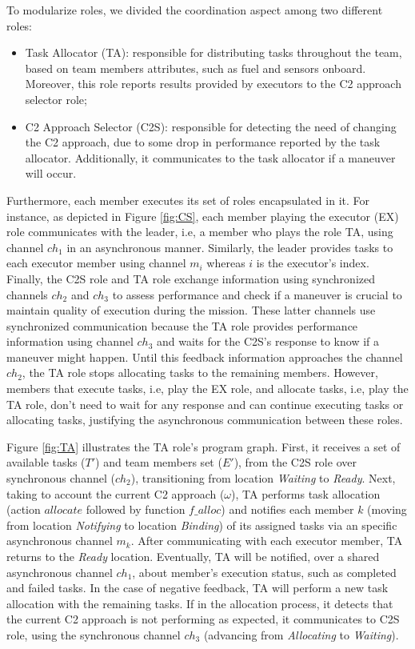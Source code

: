 To modularize roles, we divided the coordination aspect among two different roles:

\begin{itemize}
    \item Task Allocator (TA): responsible for distributing tasks throughout the team, based on team members attributes, such as fuel and sensors onboard. Moreover, this role reports results provided by executors to the C2 approach selector role;
    \item C2 Approach Selector (C2S): responsible for detecting the need of changing the C2 approach, due to some drop in performance reported by the task allocator. Additionally, it communicates to the task allocator if a maneuver will occur.  
\end{itemize}

Furthermore, each member executes its set of roles encapsulated in it. For instance, as depicted in Figure \ref{fig:CS}, each member playing the executor (EX) role communicates with the leader, i.e, a member who plays the role TA, using channel \textit{$ch_1$} in an asynchronous manner. Similarly, the leader provides tasks to each executor member using channel \textit{$m_i$} whereas $i$ is the executor's index. Finally, the C2S role and TA role exchange information using synchronized channels \textit{$ch_2$} and \textit{$ch_3$} to assess performance and check if a maneuver is crucial to maintain quality of execution during the mission. These latter channels use synchronized communication because the TA role provides performance information using channel \textit{$ch_3$} and waits for the C2S's response to know if a maneuver might happen. Until this feedback information approaches the channel \textit{$ch_2$}, the TA role stops allocating tasks to the remaining members. However, members that execute tasks, i.e, play the EX role, and allocate tasks, i.e, play the TA role, don't need to wait for any response and can continue executing tasks or allocating tasks, justifying the asynchronous communication between these roles.

Figure \ref{fig:TA} illustrates the TA role's program graph. First, it receives a set of available tasks ($T'$) and team members set ($E'$), from the C2S role over synchronous channel ($ch_2$), transitioning from location \textit{Waiting} to \textit{Ready}. Next, taking to account the current C2 approach ($\omega$), TA performs task allocation (action $allocate$ followed by function $f\_alloc$) and notifies each member $k$ (moving from location \textit{Notifying} to location \textit{Binding}) of its assigned tasks via an specific asynchronous channel $m_k$. After communicating with each executor member, TA returns to the \textit{Ready} location. Eventually, TA will be notified, over a shared asynchronous channel $ch_1$, about member's execution status, such as completed and failed tasks. In the case of negative feedback, TA will perform a new task allocation with the remaining tasks. If in the allocation process, it detects that the current C2 approach is not performing as expected, it communicates to C2S role, using the synchronous channel $ch_3$ (advancing from \textit{Allocating} to \textit{Waiting}).

